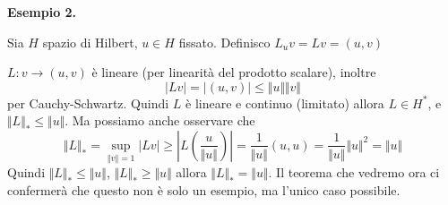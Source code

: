 \textbf{Esempio 2.}

Sia $H$ spazio di Hilbert, $\displaystyle u\in H$ fissato. Definisco $\displaystyle L_{u} v=Lv=(u,v)$

$\displaystyle L:v\rightarrow (u,v)$ è lineare (per linearità del prodotto scalare), inoltre
\begin{equation*}
    | Lv| =| (u,v)| \leq \Vert u\Vert \Vert v\Vert
\end{equation*}
per Cauchy-Schwartz. Quindi $L$ è lineare e continuo (limitato) allora $\displaystyle L\in H^{*}$, e $\displaystyle \Vert L\Vert _{*} \leq \Vert u\Vert $. Ma possiamo anche osservare che
\begin{equation*}
    \Vert L\Vert _{*} =\sup _{\Vert v\Vert =1}| Lv| \geq \left| L\left(\frac{u}{\Vert u\Vert }\right)\right| =\frac{1}{\Vert u\Vert }(u,u) =\frac{1}{\Vert u\Vert }\Vert u\Vert ^{2} =\Vert u\Vert
\end{equation*}
Quindi $\displaystyle \Vert L\Vert _{*} \leq \Vert u\Vert $, $\displaystyle \Vert L\Vert _{*} \geq \Vert u\Vert $ allora $\displaystyle \Vert L\Vert _{*} =\Vert u\Vert $. Il teorema che vedremo ora ci confermerà che questo non è solo un esempio, ma l'unico caso possibile.


